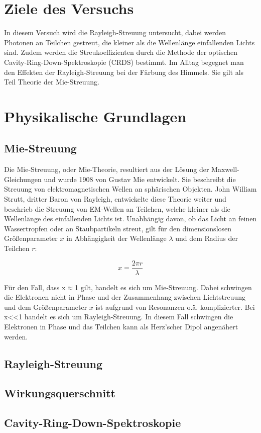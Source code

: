 \section{Ziele des Versuchs}
In diesem Versuch wird die Rayleigh-Streuung untersucht, dabei werden Photonen an Teilchen gestreut, die kleiner als die Wellenlänge einfallenden Lichts sind. Zudem werden die Streukoeffizienten durch die Methode der optischen Cavity-Ring-Down-Spektroskopie (CRDS) bestimmt. Im Alltag begegnet man den Effekten der Rayleigh-Streuung bei der Färbung des Himmels. Sie gilt als Teil Theorie der Mie-Streuung.

\section{Physikalische Grundlagen}
\subsection{Mie-Streuung}
Die Mie-Streuung, oder Mie-Theorie, resultiert aus der Lösung der Maxwell-Gleichungen und wurde 1908 von Gustav Mie entwickelt. Sie beschreibt die Streuung von elektromagnetischen Wellen an sphärischen Objekten. John William Strutt, dritter Baron von Rayleigh, entwickelte diese Theorie weiter und beschrieb die Streuung von EM-Wellen an Teilchen, welche kleiner als die Wellenlänge des einfallenden Lichts ist. Unabhängig davon, ob das Licht an feinen Wassertropfen oder an Staubpartikeln streut, gilt für den dimensionslosen Größenparameter $x$ in Abhängigkeit der Wellenlänge $\lambda$ und dem Radius der Teilchen $r$:

\begin{equation}
x = \frac{2\pi r}{\lambda}
\end{equation}

Für den Fall, dass x$\approx$1 gilt, handelt es sich um Mie-Streuung. Dabei schwingen die Elektronen nicht in Phase und der Zusammenhang zwischen Lichtstreuung und dem Größenparameter $x$ ist aufgrund von Resonanzen o.ä. komplizierter. Bei x<<1 handelt es sich um Rayleigh-Streuung. In diesem Fall schwingen die Elektronen in Phase und das Teilchen kann als Herz'scher Dipol angenähert werden. 

\subsection{Rayleigh-Streuung}

\subsection{Wirkungsquerschnitt}

\subsection{Cavity-Ring-Down-Spektroskopie}